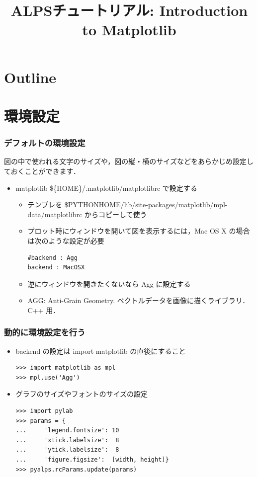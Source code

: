 
\title{ALPSチュートリアル: Introduction to Matplotlib}



\begin{frame}
  \titlepage
\end{frame}

\section*{Outline}
\begin{frame}
  \tableofcontents
\end{frame}

\section{環境設定}
\begin{frame}[t,fragile]
\frametitle{デフォルトの環境設定}
図の中で使われる文字のサイズや，図の縦・横のサイズなどをあらかじめ設定しておくことができます．
\begin{itemize}
\item matplotlib \$\{HOME\}/.matplotlib/matplotlibrc で設定する
\begin{itemize}
\item テンプレを \$PYTHONHOME/lib/site-packages/matplotlib/mpl-data/matplotlibrc からコピーして使う
\item プロット時にウィンドウを開いて図を表示するには，Mac OS X の場合は次のような設定が必要
  \begin{lstlisting}
#backend : Agg
backend : MacOSX
\end{lstlisting}
\item 逆にウィンドウを開きたくないなら Agg に設定する
\item AGG: Anti-Grain Geometry. ベクトルデータを画像に描くライブラリ．C++ 用．
\end{itemize}
\end{itemize}

\end{frame}

\begin{frame}[t,fragile]
\frametitle{動的に環境設定を行う}
\begin{itemize}
\item backend の設定は import matplotlib の直後にすること
      \begin{lstlisting}
>>> import matplotlib as mpl
>>> mpl.use('Agg')
\end{lstlisting}
\item グラフのサイズやフォントのサイズの設定
      \begin{lstlisting}
>>> import pylab
>>> params = {
...     'legend.fontsize': 10
...     'xtick.labelsize':  8
...     'ytick.labelsize':  8
...     'figure.figsize':  [width, height]}
>>> pyalps.rcParams.update(params)
\end{lstlisting}
\end{itemize}
\end{frame}

